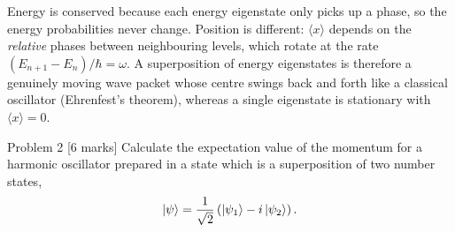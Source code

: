 \documentclass[12pt]{article}
\begin{document}
\begin{insightbox}
Energy is conserved because each energy eigenstate only picks up a phase, so the energy probabilities never change. Position is different: $\langle x\rangle$ depends on the \emph{relative} phases between neighbouring levels, which rotate at the rate $(E_{n+1}-E_n)/\hbar=\omega$. A superposition of energy eigenstates is therefore a genuinely moving wave packet whose centre swings back and forth like a classical oscillator (Ehrenfest's theorem), whereas a single eigenstate is stationary with $\langle x\rangle=0$.
\end{insightbox}
\fi

\newpage
\begin{problembox}{Problem 2 \hfill [6 marks]}
Calculate the expectation value of the momentum for a harmonic oscillator prepared in a state which is a superposition of two number states,
\[
\ket{\psi}=\frac{1}{\sqrt{2}}\left(\ket{\psi_1}-i\ket{\psi_2}\right).
\]
\end{problembox}
\end{document}
